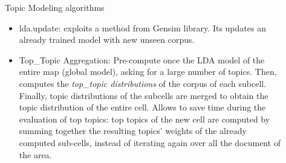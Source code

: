 \documentclass[final]{beamer}
\newlength{\sepwid}
\newlength{\onecolwid}
\newlength{\twocolwid}
\begin{document}
\begin{frame}[t]
\begin{columns}[t]
\begin{column}{\onecolwid}

\end{column} %

\begin{column}{\sepwid}\end{column} %

\begin{column}{\twocolwid} %

\begin{columns}[t,totalwidth=\twocolwid] %

\begin{column}{\onecolwid}\vspace{-.6in} %


\begin{block}{Topic Modeling algorithms}
\begin{itemize}
\item lda.update: exploits a method from Gensim library. Its updates an already trained model with new unseen corpus.

\item Top\_Topic Aggregation: Pre-compute once the LDA model of the entire map (global model), asking for a large number of topics. Then, computes the \emph{top\_topic distributions} of the corpus of each subcell. Finally, topic distributions of the subcells are merged to obtain the topic distribution of the entire cell. Allows to save time during the evaluation of top topics: top topics of the new cell are computed by summing together the resulting topics' weights of the already computed sub-cells, instead of iterating again over all the document of the area.

\end{itemize}


\end{block}


\end{column} %


\end{columns}
\end{column}
\end{columns}
\end{frame}
\end{document}
